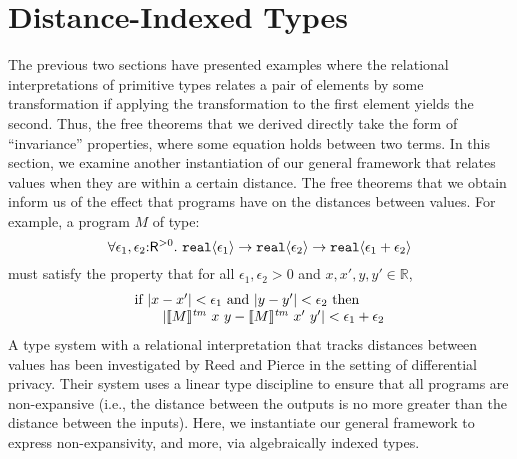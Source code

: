 \section{Distance-Indexed Types}
\label{sec:metric-types}

\newcommand{\Metric}{\mathit{Met}}
\newcommand{\metricSort}{\mathsf{R}^{>0}}

The previous two sections have presented examples where the relational
interpretations of primitive types relates a pair of elements by some
transformation if applying the transformation to the first element
yields the second. Thus, the free theorems that we derived directly
take the form of ``invariance'' properties, where some equation holds
between two terms. In this section, we examine another instantiation
of our general framework that relates values when they are within a
certain distance. The free theorems that we obtain inform us of the
effect that programs have on the distances between values. For
example, a program $M$ of type:
\begin{displaymath}
  \forall \epsilon_1,\epsilon_2\mathord:\metricSort.\ \tyPrim{real}{\epsilon_1} \to \tyPrim{real}{\epsilon_2} \to \tyPrim{real}{\epsilon_1 + \epsilon_2}
\end{displaymath}
must satisfy the property that for all $\epsilon_1, \epsilon_2 > 0$
and $x, x', y, y' \in \mathbb{R}$,
\begin{displaymath} %
  \begin{array}{l}
    \textrm{if }|x - x'| < \epsilon_1 \textrm{ and } |y - y'| < \epsilon_2 \textrm{ then}\\
    \hspace{2em}|\tmSem{M}\ x\ y - \tmSem{M}\ x'\ y'| < \epsilon_1 + \epsilon_2
  \end{array}
\end{displaymath}
A type system with a relational interpretation that tracks distances
between values has %
been investigated by Reed and Pierce
\cite{reed10distance} in the setting of differential privacy. Their
system uses a linear type discipline to ensure that all programs are
non-expansive (i.e., the distance between the outputs is no more greater
than the distance between the inputs). Here, we instantiate our general
framework %
to express
non-expansivity, and more, via algebraically indexed types.

